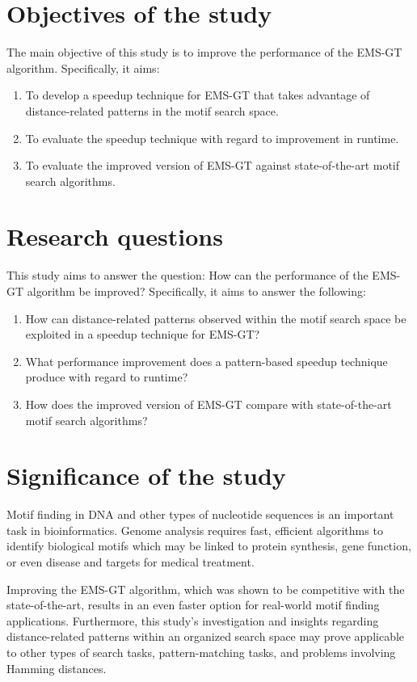 \documentclass[oneside,12pt]{DISCSthesis}
\begin{document}
	\section{Objectives of the study}
		The main objective of this study is to improve the performance of the EMS-GT algorithm. Specifically, it aims:
		\begin{enumerate}
		\item To develop a speedup technique for EMS-GT that takes advantage of distance-related patterns in the motif search space.
		\item To evaluate the speedup technique with regard to improvement in runtime. %
		\item To evaluate the improved version of EMS-GT against state-of-the-art motif search algorithms.
		\end{enumerate}

	\section{Research questions}
		This study aims to answer the question: How can the performance of the EMS-GT algorithm be improved?
		Specifically, it aims to answer the following:

		\begin{enumerate}
		\item How can distance-related patterns observed within the motif search space be exploited in a speedup technique for EMS-GT?
		\item What performance improvement does a pattern-based speedup technique produce with regard to runtime? %
		\item How does the improved version of EMS-GT compare with state-of-the-art motif search algorithms?
		\end{enumerate}

	\section{Significance of the study}
		Motif finding in DNA and other types of nucleotide sequences is an important task in bioinformatics. Genome analysis requires fast, efficient algorithms to identify biological motifs which may be linked to protein synthesis, gene function, or even disease and targets for medical treatment. 

		Improving the EMS-GT algorithm, which was shown to be competitive with the state-of-the-art, results in an even faster option for real-world motif finding applications. Furthermore, this study's investigation and insights regarding distance-related patterns within an organized search space may prove applicable to other types of search tasks, pattern-matching tasks, and problems involving Hamming distances.
\end{document}
